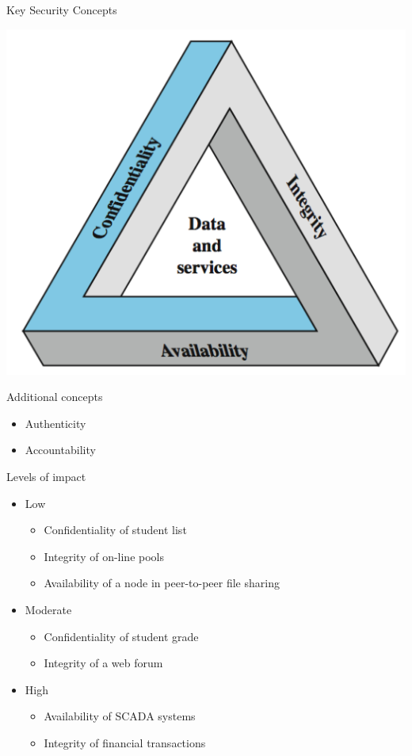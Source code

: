 \documentclass{beamer}
\begin{document}
\begin{frame}{Key Security Concepts}
  \begin{center}
    \includegraphics[width=0.7\linewidth]{concepts}
  \end{center}
\end{frame}

\begin{frame}{Additional concepts}
  \begin{itemize}
  \item Authenticity
  \item Accountability
  \end{itemize}
\end{frame}  

\begin{frame}{Levels of impact}
  \begin{itemize}
  \item Low
    \begin{itemize}
      \item Confidentiality of student list
      \item Integrity of on-line pools
      \item Availability of a node in peer-to-peer file sharing
    \end{itemize}
  \item Moderate    
    \begin{itemize}
      \item Confidentiality of student grade
      \item Integrity of a web forum
    \end{itemize}
  \item High
    \begin{itemize}
      \item Availability of SCADA systems
      \item Integrity of financial transactions
    \end{itemize}
  \end{itemize}
\end{frame}
\end{document}
